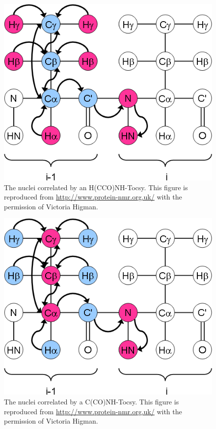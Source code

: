 \begin{figure}
  \includegraphics[scale=0.75]{figures/ccpn_hcconhtocsy}
  \caption[The nuclei correlated by an H(CCO)NH-Tocsy.]
          {The nuclei correlated by an H(CCO)NH-Tocsy.
           This figure is reproduced from \url{http://www.protein-nmr.org.uk/}
           with the permission of Victoria Higman.}
  \label{ccpn_hcconhtocsy}
\end{figure}

\begin{figure}
  \includegraphics[scale=0.75]{figures/ccpn_cconhtocsy}
  \caption[The nuclei correlated by a C(CO)NH-Tocsy.]
          {The nuclei correlated by a C(CO)NH-Tocsy.
           This figure is reproduced from \url{http://www.protein-nmr.org.uk/}
           with the permission of Victoria Higman.}
  \label{ccpn_cconhtocsy}
\end{figure}

